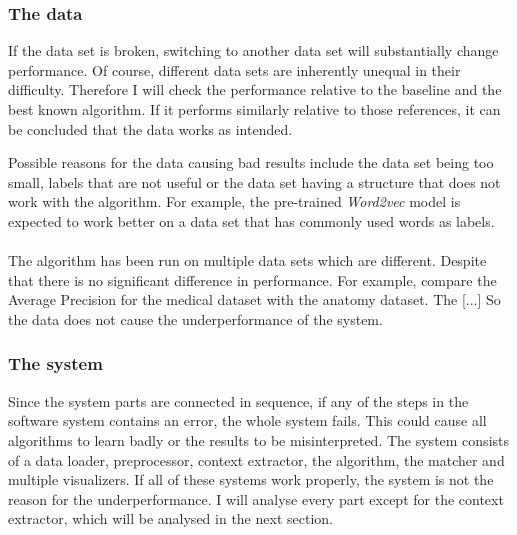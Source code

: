 \documentclass{article}
\begin{document}
  \subsubsection{The data}
  If the data set is broken, switching to another data set will substantially change performance. Of course, different data sets are inherently unequal in their difficulty. Therefore I will check the performance relative to the baseline and the best known algorithm. If it performs similarly relative to those references, it can be concluded that the data works as intended.

  Possible reasons for the data causing bad results include the data set being too small, labels that are not useful or the data set having a structure that does not work with the algorithm. For example, the pre-trained \emph{Word2vec} model is expected to work better on a data set that has commonly used words as labels. %
  \paragraph{}
 The algorithm has been run on multiple data sets which are different. Despite that there is no significant difference in performance. For example, compare the Average Precision for the medical dataset with the anatomy dataset. The [...] %
 So the data does not cause the underperformance of the system.
 
  \subsubsection{The system}
  Since the system parts are connected in sequence, if any of the steps in the software system contains an error, the whole system fails. This could cause all algorithms to learn badly or the results to be misinterpreted. The system consists of a data loader, preprocessor, context extractor, the algorithm, the matcher and multiple visualizers. If all of these systems work properly, the system is not the reason for the underperformance. I will analyse every part except for the context extractor, which will be analysed in the next section.
  
\end{document}

